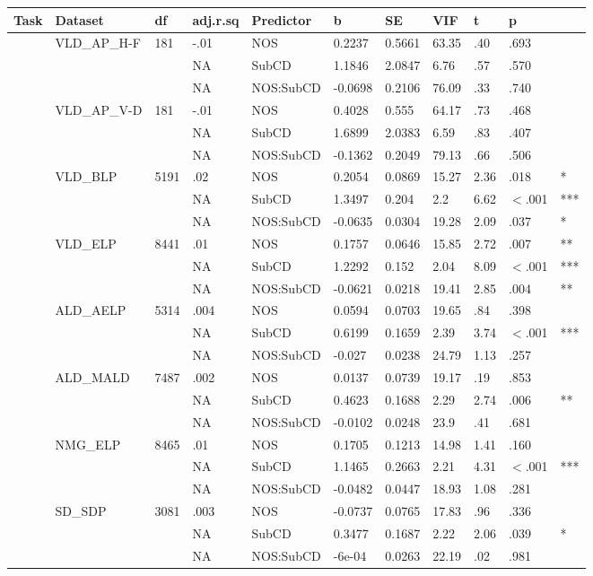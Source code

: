 \begin{table}[ht]
\centering
\begingroup\normalsize
\begin{tabular}{lllllllllll}
  \hline
Task & Dataset & df & adj.r.sq & Predictor & b & SE & VIF & t & p &  \\ 
  \hline
 & VLD\_AP\_H-F & 181 & -.01 & NOS & 0.2237 & 0.5661 & 63.35 & .40 & .693 &   \\ 
   &  &  & NA & SubCD & 1.1846 & 2.0847 & 6.76 & .57 & .570 &   \\ 
   &  &  & NA & NOS:SubCD & -0.0698 & 0.2106 & 76.09 & .33 & .740 &   \\ 
   & VLD\_AP\_V-D & 181 & -.01 & NOS & 0.4028 & 0.555 & 64.17 & .73 & .468 &   \\ 
   &  &  & NA & SubCD & 1.6899 & 2.0383 & 6.59 & .83 & .407 &   \\ 
   &  &  & NA & NOS:SubCD & -0.1362 & 0.2049 & 79.13 & .66 & .506 &   \\ 
   & VLD\_BLP & 5191 & .02 & NOS & 0.2054 & 0.0869 & 15.27 & 2.36 & .018 & * \\ 
   &  &  & NA & SubCD & 1.3497 & 0.204 & 2.2 & 6.62 & $<$.001 & *** \\ 
   &  &  & NA & NOS:SubCD & -0.0635 & 0.0304 & 19.28 & 2.09 & .037 & * \\ 
   & VLD\_ELP & 8441 & .01 & NOS & 0.1757 & 0.0646 & 15.85 & 2.72 & .007 & ** \\ 
   &  &  & NA & SubCD & 1.2292 & 0.152 & 2.04 & 8.09 & $<$.001 & *** \\ 
   &  &  & NA & NOS:SubCD & -0.0621 & 0.0218 & 19.41 & 2.85 & .004 & ** \\ 
   & ALD\_AELP & 5314 & .004 & NOS & 0.0594 & 0.0703 & 19.65 & .84 & .398 &   \\ 
   &  &  & NA & SubCD & 0.6199 & 0.1659 & 2.39 & 3.74 & $<$.001 & *** \\ 
   &  &  & NA & NOS:SubCD & -0.027 & 0.0238 & 24.79 & 1.13 & .257 &   \\ 
   & ALD\_MALD & 7487 & .002 & NOS & 0.0137 & 0.0739 & 19.17 & .19 & .853 &   \\ 
   &  &  & NA & SubCD & 0.4623 & 0.1688 & 2.29 & 2.74 & .006 & ** \\ 
   &  &  & NA & NOS:SubCD & -0.0102 & 0.0248 & 23.9 & .41 & .681 &   \\ 
   & NMG\_ELP & 8465 & .01 & NOS & 0.1705 & 0.1213 & 14.98 & 1.41 & .160 &   \\ 
   &  &  & NA & SubCD & 1.1465 & 0.2663 & 2.21 & 4.31 & $<$.001 & *** \\ 
   &  &  & NA & NOS:SubCD & -0.0482 & 0.0447 & 18.93 & 1.08 & .281 &   \\ 
   & SD\_SDP & 3081 & .003 & NOS & -0.0737 & 0.0765 & 17.83 & .96 & .336 &   \\ 
   &  &  & NA & SubCD & 0.3477 & 0.1687 & 2.22 & 2.06 & .039 & * \\ 
   &  &  & NA & NOS:SubCD & -6e-04 & 0.0263 & 22.19 & .02 & .981 &   \\ 
   \hline
\end{tabular}
\endgroup
\end{table}
